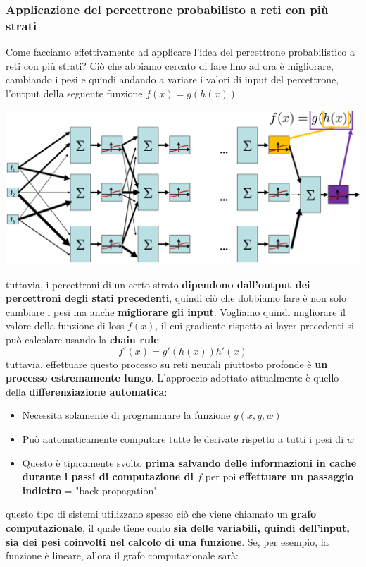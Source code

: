 \documentclass[12pt]{article}
\begin{document}
\subsubsection{Applicazione del percettrone probabilisto a reti con più strati}
Come facciamo effettivamente ad applicare l'idea del percettrone probabilistico a reti con più strati?
Ciò che abbiamo cercato di fare fino ad ora è migliorare, cambiando i pesi e quindi andando a variare i valori di input del percettrone, l'output della seguente funzione 
$f(x) = g(h(x))$
\begin{center}
    \includegraphics[width =0.80\linewidth]{Images/119.PNG}
\end{center}
tuttavia, i percettroni di un certo strato \textbf{dipendono dall'output dei percettroni degli stati precedenti}, quindi ciò che dobbiamo fare è non solo cambiare i pesi ma anche \textbf{migliorare gli input}.
Vogliamo quindi migliorare il valore della funzione di loss $f(x)$, il cui gradiente rispetto ai layer precedenti si può calcolare usando la \textbf{chain rule}:
$$f'(x) = g'(h(x))h'(x)$$
tuttavia, effettuare questo processo su reti neurali piuttosto profonde è \textbf{un processo estremamente lungo}.
L'approccio adottato attualmente è quello della \textbf{differenziazione automatica}:
\begin{itemize}
    \item Necessita solamente di programmare la funzione $g(x,y,w)$
    \item Può automaticamente computare tutte le derivate rispetto a tutti i pesi di $w$
    \item Questo è tipicamente svolto \textbf{prima salvando delle informazioni in cache durante i passi di computazione di $f$} per poi \textbf{effettuare un passaggio indietro} = "back-propagation"
\end{itemize}
questo tipo di sistemi utilizzano spesso ciò che viene chiamato un \textbf{grafo computazionale}, il quale tiene conto \textbf{sia delle variabili, quindi dell'input, sia dei pesi coinvolti nel calcolo di una funzione}.
Se, per esempio, la funzione è lineare, allora il grafo computazionale sarà:
\end{document}
